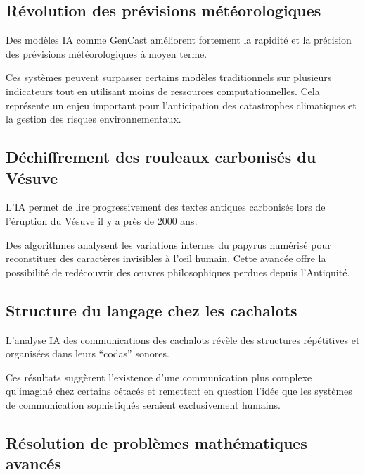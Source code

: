 \documentclass[
  10pt,
  a4paper,
  DIV=11,
  numbers=noendperiod,
  oneside]{scrreprt}
\begin{document}
\subsection{Révolution des prévisions
météorologiques}\label{ruxe9volution-des-pruxe9visions-muxe9tuxe9orologiques}

Des modèles IA comme GenCast améliorent fortement la rapidité et la
précision des prévisions météorologiques à moyen terme.

Ces systèmes peuvent surpasser certains modèles traditionnels sur
plusieurs indicateurs tout en utilisant moins de ressources
computationnelles. Cela représente un enjeu important pour
l'anticipation des catastrophes climatiques et la gestion des risques
environnementaux.

\subsection{Déchiffrement des rouleaux carbonisés du
Vésuve}\label{duxe9chiffrement-des-rouleaux-carbonisuxe9s-du-vuxe9suve}

L'IA permet de lire progressivement des textes antiques carbonisés lors
de l'éruption du Vésuve il y a près de 2000 ans.

Des algorithmes analysent les variations internes du papyrus numérisé
pour reconstituer des caractères invisibles à l'œil humain. Cette
avancée offre la possibilité de redécouvrir des œuvres philosophiques
perdues depuis l'Antiquité.

\subsection{Structure du langage chez les
cachalots}\label{structure-du-langage-chez-les-cachalots}

L'analyse IA des communications des cachalots révèle des structures
répétitives et organisées dans leurs ``codas'' sonores.

Ces résultats suggèrent l'existence d'une communication plus complexe
qu'imaginé chez certains cétacés et remettent en question l'idée que les
systèmes de communication sophistiqués seraient exclusivement humains.

\subsection{Résolution de problèmes mathématiques
avancés}\label{ruxe9solution-de-probluxe8mes-mathuxe9matiques-avancuxe9s}
\end{document}
